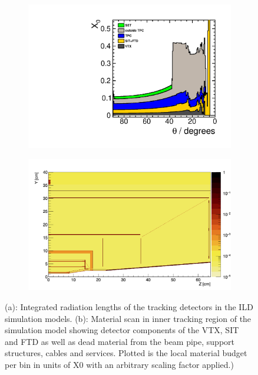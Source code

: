 
\begin{figure}[b!]
  \begin{subfigure}{0.49\hsize}
    \includegraphics[width=\textwidth]{Modelling/fig/ILD_l5_v02_matbudget_tracker_85deg.pdf}
    \caption{ \label{fig:sim_matbudget_x0}}
  \end{subfigure}
  \begin{subfigure}{0.49\hsize}
    \includegraphics[width=\textwidth]{Modelling/fig/ILD_large_inner_tracker_x0_scan.png}
    \caption{ \label{fig:sim_materialscan_vxd}}
  \end{subfigure}
  \caption{(a): Integrated radiation lengths of the tracking detectors in the ILD simulation models.
    (b): Material scan in inner tracking region of the simulation model showing detector components of the VTX, SIT and FTD as well
    as dead material from the beam pipe, support structures, cables and services. Plotted is the local material budget per bin in units of X0
    with an arbitrary scaling factor applied.) }
\end{figure}


